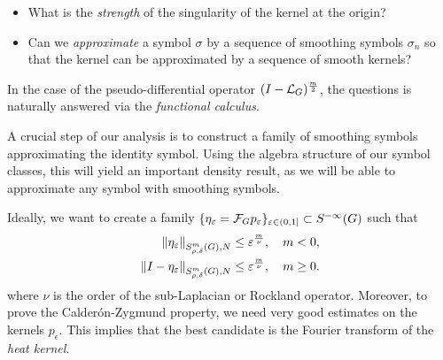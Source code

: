 \begin{itemize}
    \item What is the \emph{strength} of the singularity of the kernel at the origin?
    \item Can we \emph{approximate} a symbol $\sigma$ by a sequence of smoothing symbols $\sigma_n$ so that the kernel can be approximated by a sequence of smooth kernels?
\end{itemize}

In the case of the pseudo-differential operator $\BesselPotential m$,
the questions is naturally answered via the \emph{functional calculus}.

A crucial step of our analysis is to construct a family of smoothing symbols approximating the identity symbol.
Using the algebra structure of our symbol classes,
this will yield an important density result,
as we will be able to approximate any symbol with smoothing symbols.

Ideally,
we want to create a family $\{\eta_\epsilon = \Fourier p_\epsilon\}_{\epsilon \in (0, 1]} \subset \SmoothingSymbols$
such that
\begin{align*}
    \SymbolSemiNorm m {\rho, \delta} N {\eta_\epsilon}
    &\leq \epsilon^\frac m \nu,
    \quad m < 0,\\
    \SymbolSemiNorm m {\rho, \delta} N {\Id {} - \eta_\epsilon}
    &\leq \epsilon^\frac m \nu,
    \quad m \geq 0.
\end{align*}
where $\nu$ is the order of the sub-Laplacian or Rockland operator.
Moreover,
to prove the Calder\'on-Zygmund property,
we need very good estimates on the kernels $p_\epsilon$.
This implies that the best candidate is the Fourier transform of the \emph{heat kernel}.

